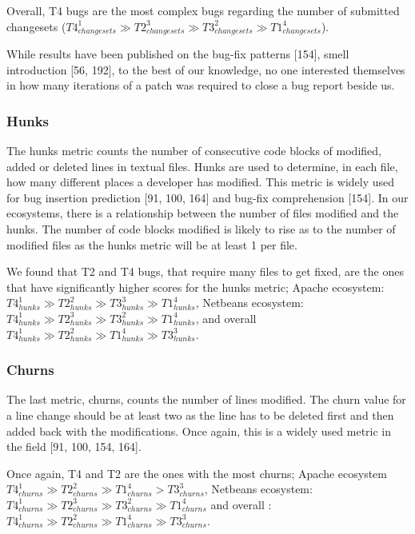 \documentclass[12pt]{report}
\begin{document}
Overall, T4 bugs are the most complex bugs regarding the number of
submitted changesets
(\(T4_{changesets}^1 \gg T2_{changesets}^3 \gg T3_{changesets}^2 \gg T1_{changesets}^4\)).

While results have been published on the bug-fix patterns {[}154{]},
smell introduction {[}56, 192{]}, to the best of our knowledge, no one
interested themselves in how many iterations of a patch was required to
close a bug report beside us.

\subsubsection{Hunks}\label{hunks}

The hunks metric counts the number of consecutive code blocks of
modified, added or deleted lines in textual files. Hunks are used to
determine, in each file, how many different places a developer has
modified. This metric is widely used for bug insertion prediction {[}91,
100, 164{]} and bug-fix comprehension {[}154{]}. In our ecosystems,
there is a relationship between the number of files modified and the
hunks. The number of code blocks modified is likely to rise as to the
number of modified files as the hunks metric will be at least 1 per
file.

We found that T2 and T4 bugs, that require many files to get fixed, are
the ones that have significantly higher scores for the hunks metric;
Apache ecosystem:
\(T4_{hunks}^1 \gg T2_{hunks}^2 \gg T3_{hunks}^3 \gg T1_{hunks}^4\),
Netbeans ecosystem:
\(T4_{hunks}^1 \gg T2_{hunks}^3 \gg T3_{hunks}^2 \gg T1_{hunks}^4\), and
overall
\(T4_{hunks}^1 \gg T2_{hunks}^2 \gg T1_{hunks}^4 \gg T3_{hunks}^3\).

\subsubsection{Churns}\label{churns}

The last metric, churns, counts the number of lines modified. The churn
value for a line change should be at least two as the line has to be
deleted first and then added back with the modifications. Once again,
this is a widely used metric in the field {[}91, 100, 154, 164{]}.

Once again, T4 and T2 are the ones with the most churns; Apache
ecosystem
\(T4_{churns}^1 \gg T2_{churns}^2 \gg T1_{churns}^4 > T3_{churns}^3\),
Netbeans ecosystem:
\(T4_{churns}^1 \gg T2_{churns}^3 \gg T3_{churns}^2 \gg T1_{churns}^4\)
and overall :
\(T4_{churns}^1 \gg T2_{churns}^2 \gg T1_{churns}^4 \gg T3_{churns}^3\).
\end{document}
